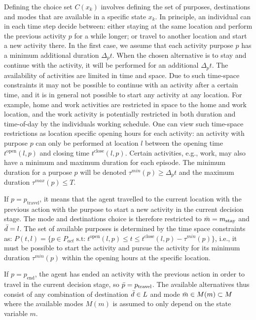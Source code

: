 Defining the choice set $C(x_k)$ involves defining the set of purposes, destinations and modes that are available in a specific state $x_k$.
In principle, an individual can in each time step decide between: either staying at the same location and perform the previous activity $p$ for a while longer; or travel to another location and start a new activity there. In the first case, we assume that each activity purpose $p$ has a minimum additional duration $\Delta_p t$. When the chosen alternative is to stay and continue with the activity, it will be performed for an additional $\Delta_p t$.
The availability of activities are limited in time and space. Due to such time-space constraints it may not be possible to continue with an activity after a certain time, and it is in general not possible to start any activity at any location. For example, home and work activities are restricted in space to the home and work location, and the work activity is potentially restricted in both duration and time-of-day by the individuals working schedule. One can view such time-space restrictions as location specific opening hours for each activity: an activity with purpose $p$ can only be performed at location $l$ between the opening time $t^{\text{open}}({l,p})$ and closing time $t^{\text{close}}({l,p})$. Certain activities, e.g., work, may also have a minimum and maximum duration for each episode. The minimum duration for a purpose $p$ will be denoted $\tau^{min}(p)\geq \Delta_p t$ and the maximum duration $\tau^{max}(p)\leq T$. 

If $p=p_\text{travel}$, it means that the agent travelled to the current location with the previous action with the purpose to start a new activity in the current decision stage. The mode and destinations choice is therefore restricted to $\bar{m} = m_{\text{stay}}$ and $\bar{d}=l$. The set of available purposes is determined by the time space constraints as:
$P(t,l) = \big \{ p \in P_{act} \;\text{s.t:} \; t^{\text{open}}({l,p}) \leq t \leq t^{\text{close}}({l,p}) - \tau^{min}(p) \big \} $, i.e., it must be possible to start the activity and pursue the activity for its minimum duration $\tau^{min}(p)$ within the opening hours at the specific location.



If $p=p_\text{end}$, the agent has ended an activity with the previous action in order to travel in the current decision stage, so $\bar{p}=p_\text{travel}$. The available alternatives thus consist of any combination of destination $\bar{d} \in L$ and mode $\bar{m}\in M(m)\subset M$ where the available modes $M(m)$ is assumed to only depend on the state variable $m$. 


